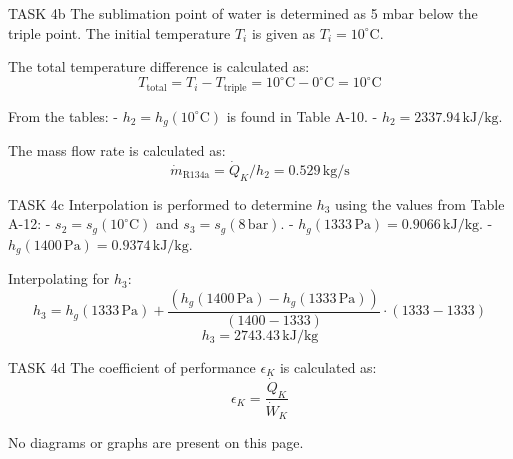 TASK 4b  
The sublimation point of water is determined as 5 mbar below the triple point. The initial temperature \( T_i \) is given as \( T_i = 10^\circ\text{C} \).  

The total temperature difference is calculated as:  
\[
T_{\text{total}} = T_i - T_{\text{triple}} = 10^\circ\text{C} - 0^\circ\text{C} = 10^\circ\text{C}
\]  

From the tables:  
- \( h_2 = h_g(10^\circ\text{C}) \) is found in Table A-10.  
- \( h_2 = 2337.94 \, \text{kJ/kg} \).  

The mass flow rate is calculated as:  
\[
\dot{m}_{\text{R134a}} = \dot{Q}_K / h_2 = 0.529 \, \text{kg/s}
\]  

TASK 4c  
Interpolation is performed to determine \( h_3 \) using the values from Table A-12:  
- \( s_2 = s_g(10^\circ\text{C}) \) and \( s_3 = s_g(8 \, \text{bar}) \).  
- \( h_g(1333 \, \text{Pa}) = 0.9066 \, \text{kJ/kg} \).  
- \( h_g(1400 \, \text{Pa}) = 0.9374 \, \text{kJ/kg} \).  

Interpolating for \( h_3 \):  
\[
h_3 = h_g(1333 \, \text{Pa}) + \frac{(h_g(1400 \, \text{Pa}) - h_g(1333 \, \text{Pa}))}{(1400 - 1333)} \cdot (1333 - 1333)
\]  
\[
h_3 = 2743.43 \, \text{kJ/kg}
\]  

TASK 4d  
The coefficient of performance \( \epsilon_K \) is calculated as:  
\[
\epsilon_K = \frac{\dot{Q}_K}{\dot{W}_K}
\]  

No diagrams or graphs are present on this page.